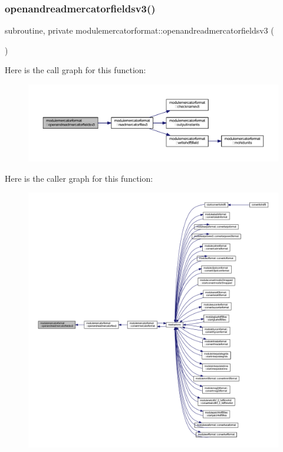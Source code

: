 \subsubsection{\texorpdfstring{openandreadmercatorfieldsv3()}{openandreadmercatorfieldsv3()}}
{\footnotesize\ttfamily subroutine, private modulemercatorformat\+::openandreadmercatorfieldsv3 (\begin{DoxyParamCaption}{ }\end{DoxyParamCaption})\hspace{0.3cm}{\ttfamily [private]}}

Here is the call graph for this function\+:\nopagebreak
\begin{figure}[H]
\begin{center}
\leavevmode
\includegraphics[width=350pt]{namespacemodulemercatorformat_a37b4ad910fc8c1eca130c7b29a79d828_cgraph}
\end{center}
\end{figure}
Here is the caller graph for this function\+:\nopagebreak
\begin{figure}[H]
\begin{center}
\leavevmode
\includegraphics[width=350pt]{namespacemodulemercatorformat_a37b4ad910fc8c1eca130c7b29a79d828_icgraph}
\end{center}
\end{figure}
\mbox{\label{namespacemodulemercatorformat_af19270e1386bf4e1df36be8a213e6370}} 

